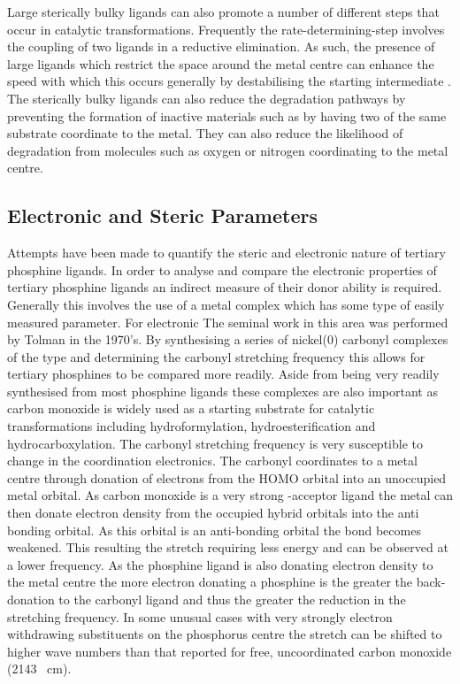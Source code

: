Large sterically bulky ligands can also promote a number of different steps that occur in catalytic transformations.  Frequently the rate-determining-step involves the coupling of two ligands in a reductive elimination.  As such, the presence of large ligands which restrict the space around the metal centre can enhance the speed with which this occurs generally by destabilising the starting intermediate .  The sterically bulky ligands can also reduce the degradation pathways by preventing the formation of inactive materials such as by having two of the same substrate coordinate to the metal.  They can also reduce the likelihood of degradation from molecules such as oxygen or nitrogen coordinating to the metal centre.  

\subsection{Electronic and Steric Parameters}

Attempts have been made to quantify the steric and electronic nature of tertiary phosphine ligands.  
In order to analyse and compare the electronic properties of tertiary phosphine ligands an indirect measure of their donor ability is required.  Generally this involves the use of a metal complex which has some type of easily measured parameter.  For electronic The seminal work in this area was performed by Tolman in the 1970's.  By synthesising a series of nickel(0) carbonyl complexes of the type \ce{[Ni(CO)3L]} and determining the carbonyl stretching frequency this allows for tertiary phosphines to be compared more readily.  Aside from being very readily synthesised from most phosphine ligands these complexes are also important as carbon monoxide is widely used as a starting substrate for catalytic transformations including hydroformylation, hydroesterification and hydrocarboxylation.  The carbonyl stretching frequency is very susceptible to change in the coordination electronics.  The carbonyl coordinates to a metal centre through donation of electrons from the HOMO  orbital into an unoccupied metal orbital.  As carbon monoxide is a very strong -acceptor ligand the metal can then donate electron density from the occupied hybrid orbitals into the  anti bonding orbital.  As this orbital is an anti-bonding orbital the  bond becomes weakened.  This resulting the  stretch requiring less energy and can be observed at a lower frequency.  As the phosphine ligand is also donating electron density to the metal centre the more electron donating a phosphine is the greater the back-donation to the carbonyl ligand and thus the greater the reduction in the  stretching frequency.  In some unusual cases with very strongly electron withdrawing substituents on the phosphorus centre the  stretch can be shifted to higher wave numbers than that reported for free, uncoordinated carbon monoxide (2143 \si{\per\cm}).  

